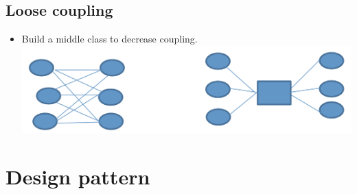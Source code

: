 \documentclass[a4paper,12pt,twoside]{book}
\begin{document}
\subsection{Loose coupling}
\begin{itemize}
\item  Build a middle class to decrease coupling.  \\
\includegraphics[scale=0.45]{pics/middle.png}
\end{itemize}

\section{Design pattern}
\end{document}
